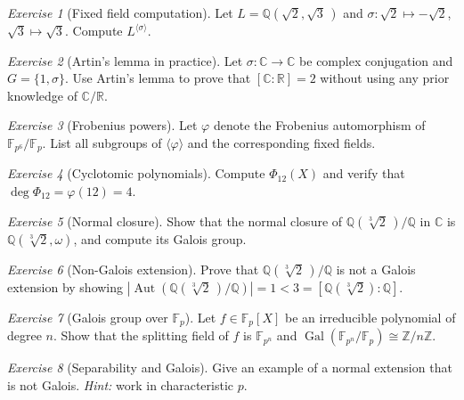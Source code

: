 \documentclass[12pt,a4paper,openany]{book}
\theoremstyle{definition}
\theoremstyle{remark}
\newtheorem{exercise}{Exercise}[chapter]
\newcommand{\Z}{\mathbb{Z}}
\newcommand{\Q}{\mathbb{Q}}
\newcommand{\R}{\mathbb{R}}
\newcommand{\C}{\mathbb{C}}
\newcommand{\F}{\mathbb{F}}
\DeclareMathOperator{\Gal}{Gal}
\DeclareMathOperator{\Aut}{Aut}
\renewcommand{\deg}{\operatorname{deg}}
\begin{document}
\begin{exercise}[Fixed field computation]\label{exo:fixed-field}
Let $L=\Q(\sqrt{2},\sqrt{3}\,)$ and $\sigma\colon\sqrt{2}\mapsto -\sqrt{2}$,
$\sqrt{3}\mapsto\sqrt{3}$.  Compute $L^{\langle\sigma\rangle}$.
\end{exercise}

\begin{exercise}[Artin's lemma in practice]\label{exo:artin-practice}
Let $\sigma\colon\C\to\C$ be complex conjugation and $G=\{1,\sigma\}$.
Use Artin's lemma to prove that $[\C:\R]=2$ without using any prior
knowledge of $\C/\R$.
\end{exercise}

\begin{exercise}[Frobenius powers]\label{exo:frobenius-powers}
Let $\varphi$ denote the Frobenius automorphism of $\F_{p^{6}}/\F_{p}$.
List all subgroups of $\langle\varphi\rangle$ and the corresponding fixed
fields.
\end{exercise}

\begin{exercise}[Cyclotomic polynomials]\label{exo:cyclo-poly}
Compute $\Phi_{12}(X)$ and verify that $\deg\Phi_{12}=\varphi(12)=4$.
\end{exercise}

\begin{exercise}[Normal closure]\label{exo:normal-closure}
Show that the normal closure of $\Q(\sqrt[3]{2}\,)/\Q$ in $\C$ is
$\Q(\sqrt[3]{2},\omega)$, and compute its Galois group.
\end{exercise}

\begin{exercise}[Non-Galois extension]\label{exo:non-galois}
Prove that $\Q(\sqrt[3]{2}\,)/\Q$ is not a Galois extension by showing
$|\!\Aut(\Q(\sqrt[3]{2}\,)/\Q)|=1<3=[\Q(\sqrt[3]{2}):\Q]$.
\end{exercise}

\begin{exercise}[Galois group over $\F_{p}$]\label{exo:gal-fp}
Let $f\in\F_{p}[X]$ be an irreducible polynomial of degree $n$.  Show that
the splitting field of $f$ is $\F_{p^{n}}$ and
$\Gal(\F_{p^{n}}/\F_{p})\cong\Z/n\Z$.
\end{exercise}

\begin{exercise}[Separability and Galois]\label{exo:sep-galois}
Give an example of a normal extension that is not Galois.
\textit{Hint:} work in characteristic $p$.
\end{exercise}
\end{document}
